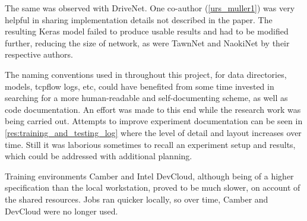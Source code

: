 The same was observed with DriveNet. One co-author (\ref{urs_muller1}) was very helpful in sharing implementation details not described in the paper. The resulting Keras model failed to produce usable results and had to be modified further, reducing the size of network, as were TawnNet and NaokiNet by their respective authors.




The naming conventions used in throughout this project, for data directories, models, tcpflow logs, etc, could have benefited from some time invested in searching for a more human-readable and self-documenting scheme, as well as code documentation. An effort was made to this end while the research work was being carried out. Attempts to improve experiment documentation can be seen in \ref{res:training_and_testing_log} where the level of detail and layout increases over time. Still it was laborious sometimes to recall an experiment setup and results, which could be addressed with additional planning.


Training environments Camber and Intel DevCloud, although being of a higher specification than the local workstation, proved to be much slower, on account of the shared resources. Jobs ran quicker locally, so over time, Camber and DevCloud were no longer used.


